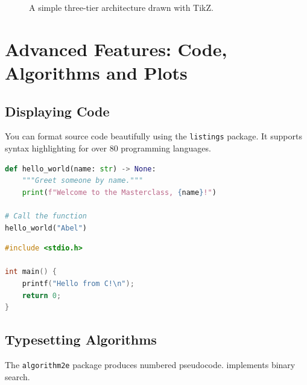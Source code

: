 \documentclass[12pt, a4paper]{article}
\theoremstyle{plain}
\theoremstyle{definition}
\begin{document}
\begin{figure}[htbp]
\centering
{}
\caption{A simple three-tier architecture drawn with TikZ.}
\label{fig:arch}
\end{figure}

\section{Advanced Features: Code, Algorithms and Plots}

\subsection{Displaying Code}
You can format source code beautifully using the \texttt{listings} package.
It supports syntax highlighting for over 80 programming languages.

\begin{lstlisting}[language=Python, caption={Python example with \texttt{listings}}]
def hello_world(name: str) -> None:
    """Greet someone by name."""
    print(f"Welcome to the Masterclass, {name}!")

# Call the function
hello_world("Abel")
\end{lstlisting}

\begin{lstlisting}[language=C, caption={C example}]
#include <stdio.h>

int main() {
    printf("Hello from C!\n");
    return 0;
}
\end{lstlisting}

\subsection{Typesetting Algorithms}
The \texttt{algorithm2e} package produces numbered pseudocode.  implements binary search.
\end{document}
